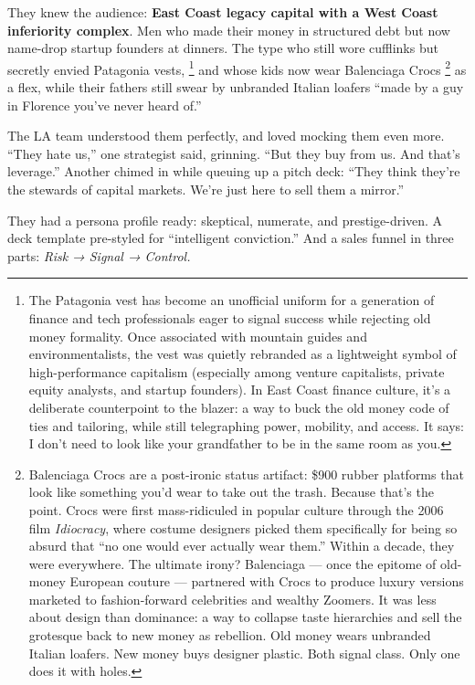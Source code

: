 They knew the audience: \textbf{East Coast legacy capital with a West Coast inferiority complex}.
Men who made their money in structured debt but now name-drop startup founders at dinners.
The type who still wore cufflinks but secretly envied Patagonia vests,
\footnote{The Patagonia vest has become an unofficial uniform for a generation of finance and tech professionals eager to 
signal success while rejecting old money formality. Once associated with mountain guides and environmentalists, the vest was 
quietly rebranded as a lightweight symbol of high-performance capitalism (especially among venture capitalists, private equity 
analysts, and startup founders). In East Coast finance culture, it’s a deliberate counterpoint to the blazer: a way to buck the 
old money code of ties and tailoring, while still telegraphing power, mobility, and access. It says: I don’t need to look like 
your grandfather to be in the same room as you.} 
and whose kids now wear Balenciaga Crocs
\footnote{Balenciaga Crocs are a post-ironic status artifact: \$900 rubber platforms that look like something you'd wear to 
take out the trash. Because that’s the point. Crocs were first mass-ridiculed in popular culture through the 2006 film 
\textit{Idiocracy}, where costume designers picked them specifically for being so absurd that “no one would ever actually wear 
them.” Within a decade, they were everywhere. The ultimate irony? Balenciaga — once the epitome of old-money European couture 
— partnered with Crocs to produce luxury versions marketed to fashion-forward celebrities and wealthy Zoomers. It was less
 about design than dominance: a way to collapse taste hierarchies and sell the grotesque back to new money as rebellion. 
 Old money wears unbranded Italian loafers. New money buys designer plastic. Both signal class. Only one does it with holes.}
 as a flex, while their fathers still swear by unbranded Italian loafers 
``made by a guy in Florence you’ve never heard of.''

The LA team understood them perfectly, and loved mocking them even more.
``They hate us,'' one strategist said, grinning. ``But they buy from us. And that’s leverage.''
Another chimed in while queuing up a pitch deck:
``They think they’re the stewards of capital markets. We’re just here to sell them a mirror.''

They had a persona profile ready: skeptical, numerate, and prestige-driven.
A deck template pre-styled for ``intelligent conviction.''
And a sales funnel in three parts:
\textit{Risk → Signal → Control.}

